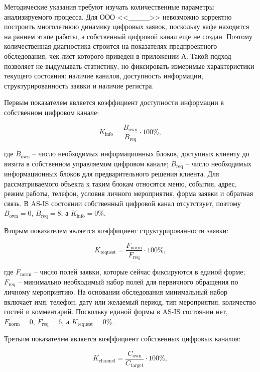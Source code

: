 Методические указания требуют изучать количественные параметры анализируемого процесса. Для ООО <<\_\_\_\_>> невозможно корректно построить многолетнюю динамику цифровых заявок, поскольку кафе находится на раннем этапе работы, а собственный цифровой канал еще не создан. Поэтому количественная диагностика строится на показателях предпроектного обследования, чек-лист которого приведен в приложении А. Такой подход позволяет не выдумывать статистику, но фиксировать измеримые характеристики текущего состояния: наличие каналов, доступность информации, структурированность заявки и наличие регистра.

Первым показателем является коэффициент доступности информации в собственном цифровом канале:

\begin{equation}
K_{\text{info}} = \frac{B_{\text{own}}}{B_{\text{req}}} \cdot 100\%,
\label{eq:ch2_info}
\end{equation}

где \(B_{\text{own}}\) -- число необходимых информационных блоков, доступных клиенту до визита в собственном управляемом цифровом канале; \(B_{\text{req}}\) -- число необходимых информационных блоков для предварительного решения клиента. Для рассматриваемого объекта к таким блокам относятся меню, события, адрес, режим работы, телефон, условия личного мероприятия, форма заявки и обратная связь. В AS-IS состоянии собственный цифровой канал отсутствует, поэтому \(B_{\text{own}} = 0\), \(B_{\text{req}} = 8\), а \(K_{\text{info}} = 0\%\).

Вторым показателем является коэффициент структурированности заявки:

\begin{equation}
K_{\text{request}} = \frac{F_{\text{norm}}}{F_{\text{req}}} \cdot 100\%,
\label{eq:ch2_request}
\end{equation}

где \(F_{\text{norm}}\) -- число полей заявки, которые сейчас фиксируются в единой форме; \(F_{\text{req}}\) -- минимально необходимый набор полей для первичного обращения по личному мероприятию. На основании обследования минимальный набор включает имя, телефон, дату или желаемый период, тип мероприятия, количество гостей и комментарий. Поскольку единой формы в AS-IS состоянии нет, \(F_{\text{norm}} = 0\), \(F_{\text{req}} = 6\), а \(K_{\text{request}} = 0\%\).

Третьим показателем является коэффициент собственных цифровых каналов:

\begin{equation}
K_{\text{channel}} = \frac{C_{\text{own}}}{C_{\text{target}}} \cdot 100\%,
\label{eq:ch2_channel}
\end{equation}

